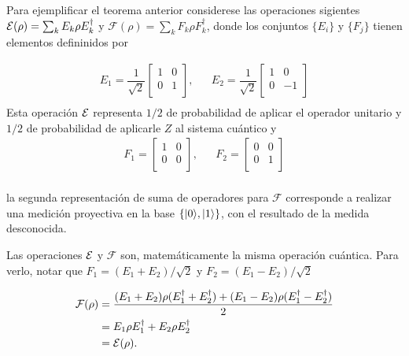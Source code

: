 Para ejemplificar el teorema anterior  considerese las operaciones sigientes $\mathcal{E}(\rho)=\sum_k E_k\rho E_k^\dagger$ y $\mathcal{F}(\rho)=\sum_k F_k\rho F_k^\dagger$, donde los conjuntos $\{E_i\}$ y $\{F_j\}$ tienen elementos defininidos por 

\begin{equation}
    \begin{array}{ccc}
        E_1=\dfrac{1}{\sqrt{2}}\begin{bmatrix}
            1&0\\
            0&1\\
        \end{bmatrix},&&E_2=\dfrac{1}{\sqrt{2}}\begin{bmatrix}
            1&0\\
            0&-1\\
        \end{bmatrix}\\
    \end{array}
\end{equation}
Esta operación $\mathcal{E}$ representa $1/2$ de probabilidad de aplicar el operador unitario y $1/2$ de probabilidad de aplicarle $Z$ al sistema cuántico y
\begin{equation}
    \begin{array}{ccc}
        F_1=\begin{bmatrix}
            1&0\\
            0&0\\
        \end{bmatrix},&&F_2=\begin{bmatrix}
            0&0\\
            0&1\\
        \end{bmatrix}\\
    \end{array}
\end{equation}

la segunda representación de suma de operadores para $\mathcal{F}$ corresponde a realizar una medición proyectiva en la base $\{|0\rangle , |1\rangle\}$, con el resultado de la medida desconocida. 



Las operaciones $\mathcal{E}$ y $\mathcal{F}$ son, matemáticamente la misma operación cuántica. Para verlo, notar que $F_1=(E_1+E_2)/\sqrt{2}$ y $F_2=(E_1-E_2)/\sqrt{2}$

\begin{equation}
    \begin{split}
        \mathcal{F}(\rho)&=\dfrac{(E_1+E_2)\rho(E_1^\dagger+E_2^\dagger)+(E_1-E_2)\rho(E_1^\dagger-E_2^\dagger)}{2}\\
        &=E_1\rho E_1^\dagger+E_2\rho E_2^\dagger\\
        &=\mathcal{E}(\rho).
    \end{split}
\end{equation}

